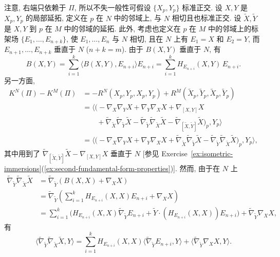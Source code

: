 \begin{RiemannProof}
注意, 右端只依赖于 $\Pi$, 所以不失一般性可假设 $\{X_p,Y_p\}$ 标准正交. 设 $X,Y$ 是 $X_p,Y_p$ 的局部延拓, 定义在 $p$ 在 $N$ 中的邻域上, 与 $N$ 相切且也标准正交. 设 $\widetilde X,\widetilde Y$ 是 $X,Y$ 到 $p$ 在 $M$ 中的邻域的延拓. 此外, 考虑也定义在 $p$ 在 $M$ 中的邻域上的标架场 $\{E_1,\ldots,E_{n+k}\}$, 使 $E_1,\ldots,E_n$ 与 $N$ 相切, 且在 $N$ 上有 $E_1=X$ 和 $E_2=Y$, 而 $E_{n+1},\ldots,E_{n+k}$ 垂直于 $N$ ($n+k=m$). 由于 $B(X,Y)$ 垂直于 $N$, 有
\[
  B(X,Y)=\sum_{i=1}^k\langle B(X,Y),E_{n+i}\rangle E_{n+i}
    =\sum_{i=1}^kH_{E_{n+i}}(X,Y)\,E_{n+i}.
\]
另一方面,
\begin{align*}
  K^N(\Pi)-K^M(\Pi)
   &=-R^N(X_p,Y_p,X_p,Y_p)+R^M(\widetilde X_p,\widetilde Y_p,\widetilde X_p,\widetilde Y_p)\\
   &=\bigl\langle\bigl(-\nabla_X\nabla_YX+\nabla_Y\nabla_XX+\nabla_{[X,Y]}X\\
   &\qquad{}+\widetilde\nabla_{\widetilde X}\widetilde\nabla_{\widetilde Y}\widetilde X
              -\widetilde\nabla_{\widetilde Y}\widetilde\nabla_{\widetilde X}\widetilde X
              -\widetilde\nabla_{[\widetilde X,\widetilde Y]}\widetilde X\bigr)_p,Y_p\bigr\rangle\\
   &=\bigl\langle\bigl(-\nabla_X\nabla_YX+\nabla_Y\nabla_XX
      +\widetilde\nabla_{\widetilde X}\widetilde\nabla_{\widetilde Y}\widetilde X
      -\widetilde\nabla_{\widetilde Y}\widetilde\nabla_{\widetilde X}\widetilde X\bigr)_p,Y_p\bigr\rangle,
\end{align*}
其中用到了 $\widetilde\nabla_{[\widetilde X,\widetilde Y]}\widetilde X-\nabla_{[X,Y]}X$ 垂直于 $N$ [参见 Exercise~\ref{ex:isometric-immersions}(\ref{ex:second-fundamental-form-properties})]. 然而, 由于在 $N$ 上
\begin{align*}
  \widetilde\nabla_{\widetilde Y}\widetilde\nabla_{\widetilde X}\widetilde X
  &=\widetilde\nabla_{\widetilde Y}(B(X,X)+\nabla_XX)\\
  &=\widetilde\nabla_{\widetilde Y}\left(\sum_{i=1}^kH_{E_{n+i}}(X,X)E_{n+i}+\nabla_XX\right)\\
  &=\sum_{i=1}^k\bigl(H_{E_{n+i}}(X,X)\widetilde\nabla_{\widetilde Y}E_{n+i}
    +\widetilde Y\cdot(H_{E_{n+i}}(X,X))E_{n+i}\bigr)
    +\widetilde\nabla_{\widetilde Y}\nabla_XX,
\end{align*}
有
\[
  \langle\widetilde\nabla_{\widetilde Y}\widetilde\nabla_{\widetilde X}\widetilde X,Y\rangle
  =\sum_{i=1}^k H_{E_{n+i}}(X,X)\langle\widetilde\nabla_{\widetilde Y}E_{n+i},Y\rangle
    +\langle\widetilde\nabla_{\widetilde Y}\nabla_XX,Y\rangle.
\]
\end{RiemannProof}
